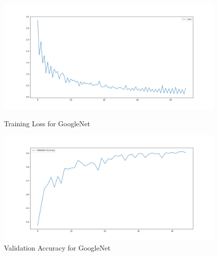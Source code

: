 \documentclass{article}
\begin{document}
\begin{figure}[!hp]
  \centering
  \begin{minipage}[b]{\textwidth}
    \includegraphics[width=\textwidth]{loss_history_GN.png}
    \caption{Training Loss for GoogleNet}
  \end{minipage}
  \hfill
  \begin{minipage}[b]{\textwidth}
    \includegraphics[width=\textwidth]{val_acc_history_GN.png}
    \caption{Validation Accuracy for GoogleNet}
  \end{minipage}
\end{figure}

\end{document}
